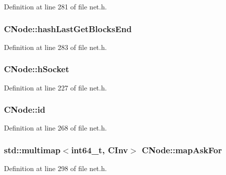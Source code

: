 Definition at line 281 of file net.\+h.

\hypertarget{class_c_node_a00f1eb04110387df966dd9c3ff3c53fb}{}
\subsubsection[{hash\+Last\+Get\+Blocks\+End}]{ C\+Node\+::hash\+Last\+Get\+Blocks\+End}\label{class_c_node_a00f1eb04110387df966dd9c3ff3c53fb}


Definition at line 283 of file net.\+h.

\hypertarget{class_c_node_a7cda6efa6a9ef9db3eebe70fc3bdd45a}{}
\subsubsection[{h\+Socket}]{ C\+Node\+::h\+Socket}\label{class_c_node_a7cda6efa6a9ef9db3eebe70fc3bdd45a}


Definition at line 227 of file net.\+h.

\hypertarget{class_c_node_af99591c635f495fc1e6c14745a2a4203}{}
\subsubsection[{id}]{ C\+Node\+::id}\label{class_c_node_af99591c635f495fc1e6c14745a2a4203}


Definition at line 268 of file net.\+h.

\hypertarget{class_c_node_a7593dfbd76c34a81169e3fb2aa0e0cf7}{}
\subsubsection[{map\+Ask\+For}]{\setlength{\rightskip}{0pt plus 5cm}std\+::multimap$<${\bf int64\+\_\+t}, {\bf C\+Inv}$>$ C\+Node\+::map\+Ask\+For}\label{class_c_node_a7593dfbd76c34a81169e3fb2aa0e0cf7}


Definition at line 298 of file net.\+h.


